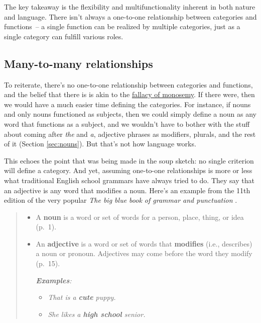 The key takeaway is the flexibility and multifunctionality inherent in both nature and language. There isn't always a one-to-one relationship between categories and functions~-- a single function can be realized by multiple categories, just as a single category can fulfill various roles.

\subsection{Many-to-many relationships} \label{sec:many-to-many}
To reiterate, there's no one-to-one relationship between categories and functions, and the belief that there is is akin to the \hyperref[sec:fallacy-of-monosemy]{fallacy of monosemy}. If there were, then we would have a much easier time defining the categories. For instance, if nouns and only nouns functioned as subjects, then we could simply define a noun as any word that functions as a subject, and we wouldn't have to bother with the stuff about coming after \textit{the} and \textit{a}, adjective phrases as modifiers, plurals, and the rest of it (Section \ref{sec:nouns}). But that's not how language works.

This echoes the point that was being made in the soup sketch: no single criterion will define a category. And yet, assuming one-to-one relationships is more or less what traditional English school grammars have always tried to do. They say that an adjective is any word that modifies a noun. Here's an example from the 11th edition of the very popular \textit{The big blue book of grammar and punctuation} \citep{straus2014}.

\begin{quote}
    \begin{itemize}[noitemsep]
        \item A \textbf{noun} is a word or set of words for a person, place, thing, or idea (p.~1).
        \item An \textbf{adjective} is a word or set of words that \textbf{modifies} (i.e., describes) a noun or pronoun. Adjectives may come before the word they modify (p.~15).
    
        \textit{\textbf{Examples}:}
        \begin{itemize}[noitemsep]
            \item \textit{That is a \textbf{cute} puppy.}
            \item \textit{She likes a \textbf{high school} senior.}
        \end{itemize}
    \end{itemize}
\end{quote}
    
